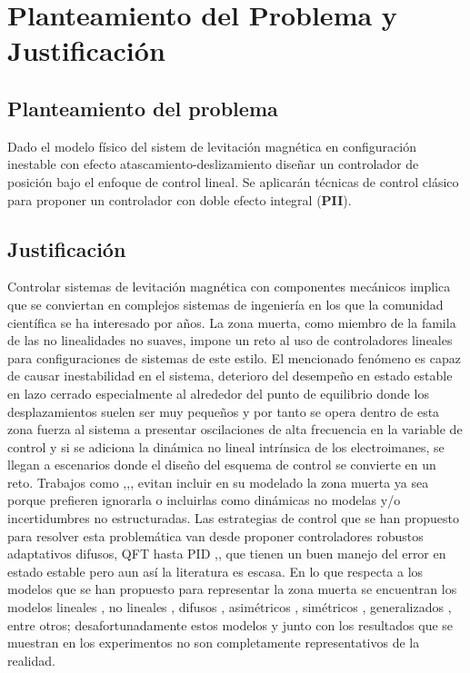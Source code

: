 \chapter{Planteamiento del Problema y Justificación}
\begin{sloppypar}
    \section{Planteamiento del problema}
    Dado el modelo físico del sistem de levitación magnética en configuración inestable con efecto atascamiento-deslizamiento 
    diseñar un controlador de posición bajo el enfoque de control lineal.
    Se aplicarán técnicas de control clásico para proponer un controlador con doble efecto integral (\textbf{PII}). 
    
    \section{Justificación}
    Controlar sistemas de levitación magnética con componentes mecánicos implica que se conviertan en complejos sistemas de ingeniería en los que la comunidad científica se ha interesado por años.
    La zona muerta, como miembro de la famila de las no linealidades no suaves, impone un reto
    al uso de controladores lineales para configuraciones de sistemas de este estilo. El mencionado fenómeno es capaz de causar inestabilidad en el sistema, 
    deterioro del desempeño en estado estable en lazo cerrado especialmente al alrededor del punto de equilibrio donde los desplazamientos suelen ser muy pequeños
    y por tanto se opera dentro de esta zona fuerza al sistema a presentar oscilaciones de alta 
    frecuencia en la variable de control y si se adiciona la dinámica no lineal intrínsica de los electroimanes,
    se llegan a escenarios donde el diseño del esquema de control se convierte en un reto. Trabajos como \cite{khimani},\cite{mukesh},\cite{neelma}, evitan incluir en su modelado
    la zona muerta ya sea porque prefieren ignorarla o incluirlas como dinámicas no modelas y/o incertidumbres no estructuradas. Las estrategias de control que se han propuesto para resolver 
    esta problemática van desde proponer controladores robustos adaptativos difusos, QFT hasta PID \cite{kuo1},\cite{mukesh},\cite{maaz} que tienen un buen manejo del error en estado estable
    pero aun así la literatura es escasa. En lo que respecta a los modelos que se han propuesto para representar la zona muerta se encuentran los modelos lineales \cite{salim}, no lineales \cite{huanqing}, difusos \cite{zhi},
    asimétricos \cite{gang}, simétricos \cite{nizar}, generalizados \cite{guanyu}, entre otros; desafortunadamente estos modelos y junto con los resultados que se muestran en los experimentos no son 
    completamente representativos de la realidad. 
    

\end{sloppypar}
